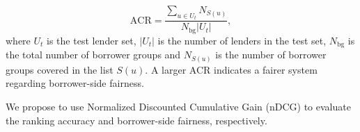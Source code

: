 
\begin{equation}
    \text{ACR}=\frac{\sum_{u\in U_t}N_{S(u)}}{N_\text{bg}|U_t|},
\end{equation}
where $U_t$ is the test lender set, $|U_t|$ is the number of lenders in the test set, $N_\text{bg}$ is the total number of borrower groups and $N_{S(u)}$ is the number of borrower groups covered in the list $S(u)$. A larger ACR indicates a fairer system regarding borrower-side fairness.

We propose to use Normalized Discounted Cumulative Gain (nDCG) to evaluate the ranking accuracy and borrower-side fairness, respectively.





